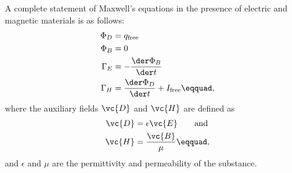 A complete statement of Maxwell's equations in the presence of electric and magnetic materials is as follows:
\begin{align*}
    \Phi_D &= q_\text{free} \\
    \Phi_B &= 0 \\
    \Gamma_E &= -\frac{\der \Phi_B}{\der t} \\
    \Gamma_H &= \frac{\der \Phi_D}{\der t} + I_\text{free}\eqquad,
\end{align*}
where the auxiliary fields $\vc{D}$ and $\vc{H}$ are defined as
\begin{align*}
  \vc{D} &=\epsilon \vc{E} \qquad  \text{and}\\
  \vc{H} &= \frac{\vc{B}}{\mu}\eqquad,
\end{align*}
and $\epsilon$ and $\mu$ are the permittivity and permeability of the substance.
